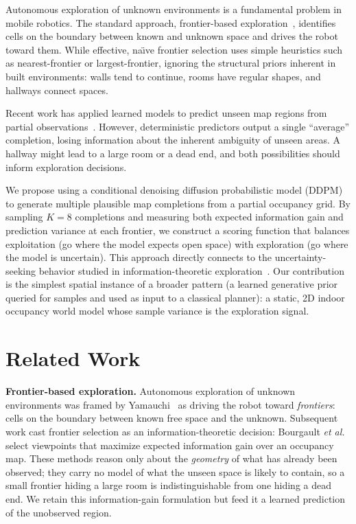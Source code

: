 \documentclass[conference]{IEEEtran}
\begin{document}
Autonomous exploration of unknown environments is a fundamental
problem in mobile robotics. The standard approach,
frontier-based exploration~\cite{yamauchi1997}, identifies cells on
the boundary between known and unknown space and drives the robot
toward them. While effective, na\"{\i}ve frontier selection uses
simple heuristics such as nearest-frontier or largest-frontier,
ignoring the structural priors inherent in built environments:
walls tend to continue, rooms have regular shapes, and hallways
connect spaces.

Recent work has applied learned models to predict unseen map regions
from partial observations~\cite{shrestha2019}. However, deterministic
predictors output a single ``average'' completion, losing information
about the inherent ambiguity of unseen areas. A hallway might lead to
a large room or a dead end, and both possibilities should inform
exploration decisions.

We propose using a conditional denoising diffusion probabilistic model
(DDPM)~\cite{ho2020} to generate multiple plausible map completions
from a partial occupancy grid. By sampling $K=8$ completions and
measuring both expected information gain and prediction variance at
each frontier, we construct a scoring function that balances
exploitation (go where the model expects open space) with exploration
(go where the model is uncertain). This approach directly connects to
the uncertainty-seeking behavior studied in information-theoretic
exploration~\cite{bourgault2002}. Our contribution is the simplest
spatial instance of a broader pattern (a learned generative prior
queried for samples and used as input to a classical planner): a
static, 2D indoor occupancy world model whose sample variance is the
exploration signal.

\section{Related Work}

\textbf{Frontier-based exploration.} Autonomous exploration of unknown
environments was framed by Yamauchi~\cite{yamauchi1997} as driving the
robot toward \emph{frontiers}: cells on the boundary between known
free space and the unknown. Subsequent work cast frontier selection as
an information-theoretic decision: Bourgault \emph{et
al.}~\cite{bourgault2002} select viewpoints that maximize expected
information gain over an occupancy map. These methods reason only about
the \emph{geometry} of what has already been observed; they carry no
model of what the unseen space is likely to contain, so a small
frontier hiding a large room is indistinguishable from one hiding a
dead end. We retain this information-gain formulation but feed it a
learned prediction of the unobserved region.
\end{document}
